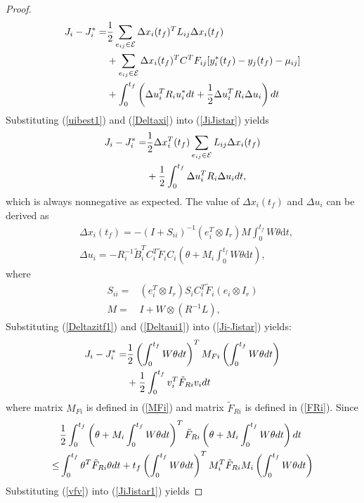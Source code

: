 \documentclass[10pt,doublecolumn]{IEEEtran}  %
\begin{document}
\begin{proof}
\begin{align}
J_i-J_i^*
=&\frac{1}{2}\sum_{e_{ij}\in\mathcal{E}}\Delta x_i(t_f)^TL_{ij}\Delta x_i(t_f)\notag\\
&+\sum_{e_{ij}\in\mathcal{E}}\Delta x_i(t_f)^TC^TF_{ij}[y_i^*(t_f)-y_j(t_f)-\mu_{ij}]\notag\\
&+\int^{t_f}_0\left(\Delta u_i^TR_i u_i^*dt+\frac{1}{2}\Delta u_i^TR_i\Delta u_i\right)dt
\label{JiJistar}
\end{align}
Substituting (\ref{uibest1}) and (\ref{Deltaxi}) into (\ref{JiJistar}) yields
\begin{align}
J_i-J_i^*=&\frac{1}{2}\Delta x^T_i(t_f)\sum_{e_{ij}\in\mathcal{E}}L_{ij}\Delta x_i(t_f)\notag\\
&+\frac{1}{2}\int^{t_f}_0\Delta u_i^TR_i\Delta u_idt\label{Ji-Jistar},
\end{align}
which is always nonnegative as expected. The value of $\Delta x_i(t_f)$ and $\Delta u_i$ can be derived as 
\begin{align}
&\Delta x_i(t_f)=-(I+S_{ii})^{-1}(e_i^T\otimes
I_r)M\int^{t_f}_0W\theta \mbox{d}t ,\label{Deltazitf1}\\
&\Delta u_i
=-R^{-1}_i\tilde{B}_i^TC_i^T\tilde{F}_iC_i \left(\theta+
M_i\int^{t_f}_0W\theta\mbox{d}t\right),\label{Deltaui1}
\end{align}
where 
\begin{align}
S_{ii}=&(e_i^T\otimes I_r)S_iC_i^T\tilde{F}_i(e_i\otimes I_r)\label{dSkd}\\
M=&I+W\otimes (R^{-1}L),\label{M}
\end{align}
Substituting (\ref{Deltazitf1}) and (\ref{Deltaui1}) into (\ref{Ji-Jistar}) yields:
\begin{align}
J_i-J_i^*
=&\frac{1}{2} \left(\int^{t_f}_0W\theta\mbox{d}t\right)^T M_{Fi}\left(\int^{t_f}_0W\theta\mbox{d}t\right) \notag\\
&+\frac{1}{2}\int^{t_f}_0
v_i^T \tilde{F}_{Ri}v_i\mbox{d}t\label{JiJistar1}
\end{align}
where matrix $M_{Fi}$ is defined in (\ref{MFi}) and matrix $\tilde{F}_{Ri}$ is
defined in (\ref{FRi}). Since
\begin{align}
&\frac{1}{2}
\int^{t_f}_0\left( \theta+M_i\int^{t_f}_0W\theta\mbox{d}t\right)^T \tilde{F}_{Ri}\left( \theta+M_i\int^{t_f}_0W\theta\mbox{d}t\right)\mbox{d}t
\notag\\
\leq&
\int^{t_f}_0\theta^T\tilde{F}_{Ri}\theta\mbox{d}t+ t_f\left(\int^{t_f}_0W\theta\mbox{d}t\right)^T M_i^T\tilde{F}_{Ri}M_i \left(\int^{t_f}_0W\theta\mbox{d}t\right)\label{vfv}
\end{align}
Substituting (\ref{vfv}) into (\ref{JiJistar1}) yields

\end{proof}
\end{document}
